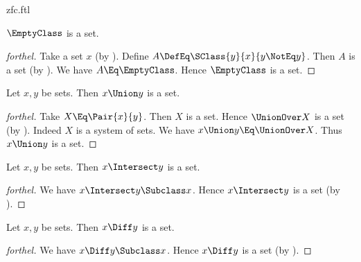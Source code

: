 \documentclass{stex}
\begin{document}
\begin{smodule}{zfc.ftl}


\begin{proposition*}[forthel]
  $\EmptyClass$ is a set.
\end{proposition*}
\begin{proof}[forthel]
  Take a set $x$ (by ).
  Define $A \DefEq \SClass{y}{x}{y \NotEq y}$.
  Then $A$ is a set (by ).
  We have $A \Eq \EmptyClass$.
  Hence $\EmptyClass$ is a set.
\end{proof}

\begin{proposition*}[forthel]
  Let $x, y$ be sets.
  Then $x \Union y$ is a set.
\end{proposition*}
\begin{proof}[forthel]
  Take $X \Eq \Pair{x}{y}$.
  Then $X$ is a set.
  Hence $\UnionOver X$ is a set (by ).
  Indeed $X$ is a system of sets.
  We have $x \Union y \Eq \UnionOver X$.
  Thus $x \Union y$ is a set.
\end{proof}

\begin{proposition*}[forthel]
  Let $x, y$ be sets.
  Then $x \Intersect y$ is a set.
\end{proposition*}
\begin{proof}[forthel]
  We have $x \Intersect y \Subclass x$.
  Hence $x \Intersect y$ is a set (by ).
\end{proof}

\begin{proposition*}[forthel]
  Let $x, y$ be sets.
  Then $x \Diff y$ is a set.
\end{proposition*}
\begin{proof}[forthel]
  We have $x \Diff y \Subclass x$.
  Hence $x \Diff y$ is a set (by ).
\end{proof}


\end{smodule}
\end{document}
